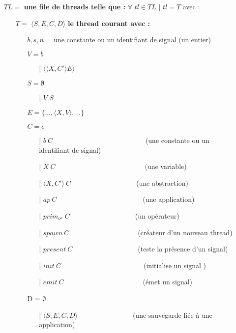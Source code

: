 \documentclass[10pt,a4paper]{report}
\begin{document}
	\begin{itemize}
		\item[] $TL =$ \textbf{une file de threads telle que :} $\forall$ $tl \in TL$ $|$ $tl = T$ avec :
		\begin{itemize}
			\item[] $T =$ $\langle S,E,C,D\rangle$ \textbf{le thread courant avec :}
			\begin{itemize}
				\item[] $b,s,n$ = une constante ou un identifiant de signal (un entier)
				\item[] $V = b$	
				\begin{itemize}
					\item[|] $\langle\langle X,C' \rangle E\rangle$
				\end{itemize}
				\item[] $S =  \emptyset$ 
				\begin{itemize}
					\item[|] $V$ $S$
				\end{itemize}
				\item[] $E = \{...,\langle X,V\rangle,...\}$
				\item[] $C = \epsilon$								
				\begin{itemize}
					\item[|] $b~C$~~~~~~~~~~~~~~~~~~~~~~~~~~~(une constante ou un identifiant de signal)
					\item[|] $X~C$~~~~~~~~~~~~~~~~~~~~~~~~~~(une variable)
					\item[|] $\langle X,C'\rangle~C$~~~~~~~~~~~~~~~~~~~(une abstraction)
					\item[|] $ap~C$~~~~~~~~~~~~~~~~~~~~~~~~~(une application)
					\item[|] $prim_{o^{n}}~C$~~~~~~~~~~~~~~~~~~~(un opérateur)
					\item[|] $spawn~C$~~~~~~~~~~~~~~~~~~~~(créateur d'un nouveau thread)
					\item[|] $present~C$~~~~~~~~~~~~~~~~~~~(teste la présence d'un signal)
					\item[|] $init~C$~~~~~~~~~~~~~~~~~~~~~~~~(initialise un signal )
					\item[|] $emit~C$~~~~~~~~~~~~~~~~~~~~~~~(émet un signal)
				\end{itemize}
				\item[] D = $\emptyset$
				\begin{itemize}
					\item[|] $\langle S,E,C,D\rangle$~~~~~~~~~~~~~~~~(une sauvegarde liée à une application)

\end{itemize}
\end{itemize}
\end{itemize}
\end{itemize}
\end{document}
